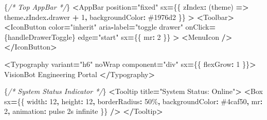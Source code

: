 \documentclass[
]{article}
\newenvironment{Shaded}{\begin{snugshade}}{\end{snugshade}}
\newcommand{\AttributeTok}[1]{\textcolor[rgb]{0.13,0.29,0.53}{#1}}
\newcommand{\CommentTok}[1]{\textcolor[rgb]{0.56,0.35,0.01}{\textit{#1}}}
\newcommand{\DecValTok}[1]{\textcolor[rgb]{0.00,0.00,0.81}{#1}}
\newcommand{\KeywordTok}[1]{\textcolor[rgb]{0.13,0.29,0.53}{\textbf{#1}}}
\newcommand{\NormalTok}[1]{#1}
\newcommand{\OperatorTok}[1]{\textcolor[rgb]{0.81,0.36,0.00}{\textbf{#1}}}
\newcommand{\StringTok}[1]{\textcolor[rgb]{0.31,0.60,0.02}{#1}}
\begin{document}
\begin{Shaded}
\begin{Highlighting}[]
\NormalTok{        \{}\CommentTok{/* Top AppBar */}\NormalTok{\}}
        \OperatorTok{\textless{}}\NormalTok{AppBar}
\NormalTok{          position}\OperatorTok{=}\StringTok{"fixed"}
\NormalTok{          sx}\OperatorTok{=}\NormalTok{\{\{}
\NormalTok{            zIndex}\OperatorTok{:}\NormalTok{ (theme) }\KeywordTok{=\textgreater{}}\NormalTok{ theme}\OperatorTok{.}\AttributeTok{zIndex}\OperatorTok{.}\AttributeTok{drawer} \OperatorTok{+} \DecValTok{1}\OperatorTok{,}
\NormalTok{            backgroundColor}\OperatorTok{:} \StringTok{\textquotesingle{}\#1976d2\textquotesingle{}}
\NormalTok{          \}\}}
        \OperatorTok{\textgreater{}}
          \OperatorTok{\textless{}}\NormalTok{Toolbar}\OperatorTok{\textgreater{}}
            \OperatorTok{\textless{}}\NormalTok{IconButton}
\NormalTok{              color}\OperatorTok{=}\StringTok{"inherit"}
\NormalTok{              aria}\OperatorTok{{-}}\NormalTok{label}\OperatorTok{=}\StringTok{"toggle drawer"}
\NormalTok{              onClick}\OperatorTok{=}\NormalTok{\{handleDrawerToggle\}}
\NormalTok{              edge}\OperatorTok{=}\StringTok{"start"}
\NormalTok{              sx}\OperatorTok{=}\NormalTok{\{\{ mr}\OperatorTok{:} \DecValTok{2}\NormalTok{ \}\}}
            \OperatorTok{\textgreater{}}
              \OperatorTok{\textless{}}\NormalTok{MenuIcon }\OperatorTok{/\textgreater{}}
            \OperatorTok{\textless{}/}\NormalTok{IconButton}\OperatorTok{\textgreater{}}

            \OperatorTok{\textless{}}\NormalTok{Typography variant}\OperatorTok{=}\StringTok{"h6"}\NormalTok{ noWrap component}\OperatorTok{=}\StringTok{"div"}\NormalTok{ sx}\OperatorTok{=}\NormalTok{\{\{ flexGrow}\OperatorTok{:} \DecValTok{1}\NormalTok{ \}\}}\OperatorTok{\textgreater{}}
\NormalTok{              VisionBot Engineering Portal}
            \OperatorTok{\textless{}/}\NormalTok{Typography}\OperatorTok{\textgreater{}}

\NormalTok{            \{}\CommentTok{/* System Status Indicator */}\NormalTok{\}}
            \OperatorTok{\textless{}}\NormalTok{Tooltip title}\OperatorTok{=}\StringTok{"System Status: Online"}\OperatorTok{\textgreater{}}
              \OperatorTok{\textless{}}\NormalTok{Box}
\NormalTok{                sx}\OperatorTok{=}\NormalTok{\{\{}
\NormalTok{                  width}\OperatorTok{:} \DecValTok{12}\OperatorTok{,}
\NormalTok{                  height}\OperatorTok{:} \DecValTok{12}\OperatorTok{,}
\NormalTok{                  borderRadius}\OperatorTok{:} \StringTok{\textquotesingle{}50\%\textquotesingle{}}\OperatorTok{,}
\NormalTok{                  backgroundColor}\OperatorTok{:} \StringTok{\textquotesingle{}\#4caf50\textquotesingle{}}\OperatorTok{,}
\NormalTok{                  mr}\OperatorTok{:} \DecValTok{2}\OperatorTok{,}
\NormalTok{                  animation}\OperatorTok{:} \StringTok{\textquotesingle{}pulse 2s infinite\textquotesingle{}}
\NormalTok{                \}\}}
              \OperatorTok{/\textgreater{}}
            \OperatorTok{\textless{}/}\NormalTok{Tooltip}\OperatorTok{\textgreater{}}


\end{Highlighting}
\end{Shaded}
\end{document}
